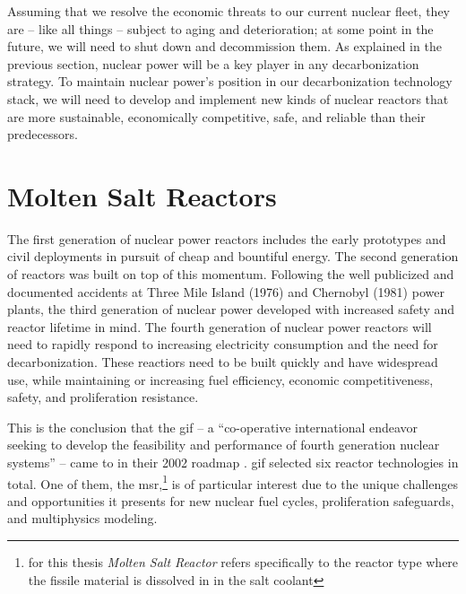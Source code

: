 Assuming that we resolve the economic threats to our current nuclear fleet, they
are -- like all things -- subject to aging and deterioration; at some point in
the future, we will need to shut down and decommission them. As explained in the
previous section, nuclear power will be a key player in any decarbonization
strategy. To maintain nuclear power's position in our decarbonization technology stack, we
will need to develop and implement new kinds of nuclear reactors that are more
sustainable, economically competitive, safe, and reliable than their
predecessors.
 
\section{Molten Salt Reactors}%
\label{sec:molten_salt_reactors}

The first generation of nuclear power reactors includes the early prototypes and
civil deployments in pursuit of cheap and bountiful energy. The second
generation of reactors was built on top of this momentum. Following the well
publicized and documented accidents at Three Mile Island (1976) and Chernobyl
(1981) power plants, the third generation of nuclear power developed with
increased safety and reactor lifetime in mind. The fourth generation of nuclear
power reactors will need to rapidly respond to increasing electricity
consumption and the need for decarbonization. These reactiors need to be built
quickly and have widespread use, while
maintaining or increasing fuel efficiency, economic competitiveness, safety, and
proliferation resistance.

This is the conclusion that the \Gls{gif} -- a ``co-operative
international endeavor seeking to develop the feasibility and performance of
fourth generation nuclear systems'' \cite{gif_homepage} -- came to in their 2002
roadmap \cite{doe-ne_technology_2002}. \Gls{gif} selected six reactor
technologies in total. One of them, the \Gls{msr},\footnote{for
this thesis {\it Molten Salt Reactor} refers specifically to the reactor type
where the fissile material is dissolved in in the salt coolant} is of
particular interest due to the unique challenges and opportunities it presents
for new nuclear fuel cycles, proliferation safeguards, and multiphysics
modeling.


